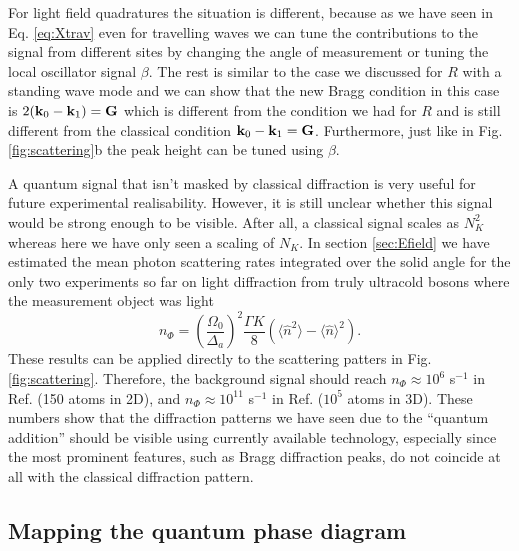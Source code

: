For light field quadratures the situation is different, because as we
have seen in Eq. \eqref{eq:Xtrav} even for travelling waves we can
tune the contributions to the signal from different sites by changing
the angle of measurement or tuning the local oscillator signal
$\beta$. The rest is similar to the case we discussed for $R$ with a
standing wave mode and we can show that the new Bragg condition in
this case is $2 (\mathbf{k}_0 - \mathbf{k}_1) = \mathbf{G}$ which is different from
the condition we had for $R$ and is still different from the classical
condition $\mathbf{k}_0 - \mathbf{k}_1 = \mathbf{G}$. Furthermore, just like in
Fig. \ref{fig:scattering}b the peak height can be tuned using $\beta$.

A quantum signal that isn't masked by classical diffraction is very
useful for future experimental realisability. However, it is still
unclear whether this signal would be strong enough to be
visible. After all, a classical signal scales as $N_K^2$ whereas here
we have only seen a scaling of $N_K$. In section \ref{sec:Efield} we
have estimated the mean photon scattering rates integrated over the
solid angle for the only two experiments so far on light diffraction
from truly ultracold bosons where the measurement object was light
\begin{equation} 
  n_{\Phi}= \left(\frac{\Omega_0}{\Delta_a}\right)^2 \frac{\Gamma K}{8}
  (\langle\hat{n}^2\rangle-\langle\hat{n}\rangle^2).
\end{equation} 
These results can be applied directly to the scattering patters in
Fig. \ref{fig:scattering}. Therefore, the background signal should
reach $n_\Phi \approx 10^6$ s$^{-1}$ in Ref. \cite{weitenberg2011}
(150 atoms in 2D), and $n_\Phi \approx 10^{11}$ s$^{-1}$ in
Ref. \cite{miyake2011} ($10^5$ atoms in 3D). These numbers show that
the diffraction patterns we have seen due to the ``quantum addition''
should be visible using currently available technology, especially
since the most prominent features, such as Bragg diffraction peaks, do
not coincide at all with the classical diffraction pattern.

\subsection{Mapping the quantum phase diagram}

